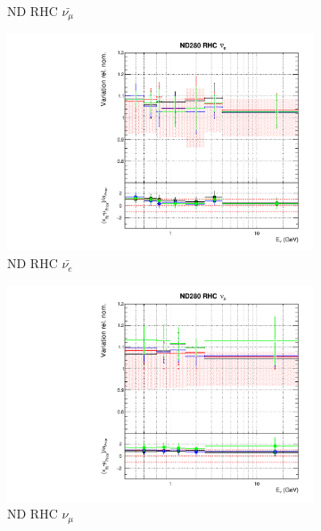 \begin{figure}[t]
\begin{subfigure}{0.24\textwidth}
  \caption{ND RHC $\bar{\nu_{\mu}}$}
  \label{fig:}
\end{subfigure}
\begin{subfigure}{0.24\textwidth}
  \centering
  \includegraphics[width=0.95\linewidth]{figs/detcovbinflux_5}
  \caption{ND RHC $\bar{\nu_{e}}$}
  \label{fig:}
\end{subfigure}
\begin{subfigure}{0.24\textwidth}
  \centering
  \includegraphics[width=0.95\linewidth]{figs/detcovbinflux_6}
  \caption{ND RHC $\nu_{\mu}$}
  \label{fig:}
\end{subfigure}
\vspace{15mm}
\begin{subfigure}{0.24\textwidth}
  \centering

\end{subfigure}
\end{figure}
